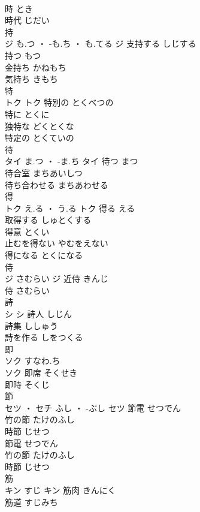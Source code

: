 \documentclass[8pt]{extreport}
\begin{document}
\begin{CJK}{UTF8}{min}
\\	時	とき	
\\	時代	じだい	
\\	持	
\\	ジ	も.つ ・ -も.ち ・ も.てる	ジ	支持する	しじする	
\\	持つ	もつ	
\\	金持ち	かねもち	
\\	気持ち	きもち	
\\	特	
\\	トク		トク	特別の	とくべつの	
\\	特に	とくに	
\\	独特な	どくとくな	
\\	特定の	とくていの	
\\	待	
\\	タイ	ま.つ ・ -ま.ち	タイ	待つ	まつ	
\\	待合室	まちあいしつ	
\\	待ち合わせる	まちあわせる	
\\	得	
\\	トク	え.る ・ う.る	トク	得る	える	
\\	取得する	しゅとくする	
\\	得意	とくい	
\\	止むを得ない	やむをえない	
\\	得になる	とくになる	
\\	侍	
\\	ジ	さむらい	ジ	近侍	きんじ	
\\	侍	さむらい	
\\	詩	
\\	シ		シ	詩人	しじん	
\\	詩集	ししゅう	
\\	詩を作る	しをつくる	
\\	即	
\\	ソク	すなわ.ち
\\	ソク	即席	そくせき	
\\	即時	そくじ	
\\	節	
\\	セツ ・ セチ	ふし ・ -ぶし	セツ	節電	せつでん	
\\	竹の節	たけのふし	
\\	時節	じせつ	
\\	節電	せつでん	
\\	竹の節	たけのふし	
\\	時節	じせつ	
\\	筋	
\\	キン	すじ	キン	筋肉	きんにく	
\\	筋道	すじみち	

\end{CJK}
\end{document}

